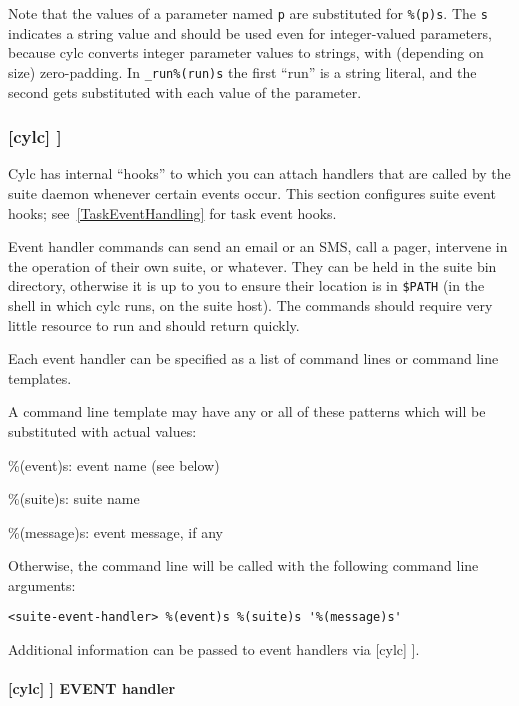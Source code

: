 Note that the values of a parameter named \lstinline=p= are substituted for
\lstinline=%(p)s=.  The \lstinline=s= indicates a string value and should
be used even for integer-valued parameters, because cylc converts integer
parameter values to strings, with (depending on size) zero-padding. In
\lstinline=_run%(run)s= the first ``run'' is a string literal, and the second
gets substituted with each value of the parameter.

\subsubsection[{[[}events{]]}]{[cylc] \textrightarrow [[events]]}
\label{SuiteEventHandling}

Cylc has internal ``hooks'' to which you can attach handlers that are
called by the suite daemon whenever certain events occur. This section
configures suite event hooks; see~\ref{TaskEventHandling} for
task event hooks.

Event handler commands can send an email or an SMS, call a pager, intervene in
the operation of their own suite, or whatever.
They can be held in the suite bin directory, otherwise it is up to you
to ensure their location is in \lstinline=$PATH= (in the shell in which
cylc runs, on the suite host). The commands should require
very little resource to run and should return quickly.

Each event handler can be specified as a list of command lines or command
line templates.

A command line template may have any or all of these patterns which will be
substituted with actual values:
\begin{myitemize}
    \item \%(event)s: event name (see below)
    \item \%(suite)s: suite name
    \item \%(message)s: event message, if any
\end{myitemize}

Otherwise, the command line will be called with the following command line
arguments:
\begin{lstlisting}
<suite-event-handler> %(event)s %(suite)s '%(message)s'
\end{lstlisting}

Additional information can be passed to event handlers via
[cylc] \textrightarrow [[environment]].

\paragraph[EVENT handler]{[cylc] \textrightarrow [[events]] \textrightarrow EVENT handler}

